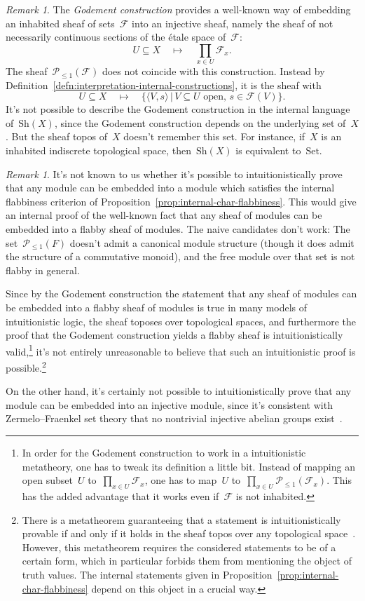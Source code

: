 \documentclass[10pt,reqno,a4paper]{amsbook}
\theoremstyle{definition}
\theoremstyle{plain}
\theoremstyle{remark}
\newtheorem{rem}[defn]{Remark}
\newcommand{\F}{\mathcal{F}}
\renewcommand{\P}{\mathcal{P}}
\newcommand{\Set}{\mathrm{Set}}
\newcommand{\Sh}{\mathrm{Sh}}
\newcommand{\?}{\,{:}\,}
\renewcommand{\_}{\mathpunct{.}\,}
\begin{document}
\begin{rem}\label{rem:godement-construction}
The \emph{Godement construction} provides a well-known way of embedding an
inhabited sheaf of sets~$\F$ into an injective sheaf, namely
the sheaf of not necessarily continuous sections of the étale space of~$\F$:
\[ U \subseteq X \quad\longmapsto\quad
  \prod_{x \in U} \F_x. \]
The sheaf~$\P_{\leq1}(\F)$ does not coincide with this construction.
Instead by Definition~\ref{defn:interpretation-internal-constructions}, it is the sheaf with
\[ U \subseteq X \quad\longmapsto\quad
  \{ \langle V, s \rangle \,|\,
    \text{$V \subseteq U$ open, $s \in \F(V)$} \}. \]
It's not possible to describe the Godement construction in the internal language
of~$\Sh(X)$, since the Godement construction depends on the underlying set of~$X$.
But the sheaf topos of~$X$ doesn't remember this set. For instance, if~$X$
is an inhabited indiscrete topological space, then~$\Sh(X)$ is equivalent
to~$\Set$.
\end{rem}

\begin{rem}It's not known to us whether it's possible to intuitionistically
prove that any module can be embedded into a module which satisfies the internal
flabbiness criterion of Proposition~\ref{prop:internal-char-flabbiness}. This
would give an internal proof of the well-known fact that any sheaf of modules can be embedded into a
flabby sheaf of modules. The naive candidates don't work: The
set~$\P_{\leq1}(F)$ doesn't admit a canonical module structure (though it does admit the structure of a commutative monoid), and the free
module over that set is not flabby in general.

Since by the Godement construction the statement that any sheaf of modules can
be embedded into a flabby sheaf of modules is true in many models of
intuitionistic logic, the sheaf toposes over topological spaces, and
furthermore the proof that the Godement construction yields a flabby sheaf is
intuitionistically valid,\footnote{In order for the Godement construction to
work in a intuitionistic metatheory, one has to tweak its definition a little
bit. Instead of mapping an open subset~$U$ to~$\prod_{x \in U} \F_x$, one has
to map~$U$ to~$\prod_{x \in U} \P_{\leq1}(\F_x)$. This has the added advantage
that it works even if~$\F$ is not inhabited.} it's not entirely unreasonable to believe
that such an intuitionistic proof is possible.\footnote{There is a metatheorem
guaranteeing that a statement is intuitionistically provable if and only if it
holds in the sheaf topos over any topological
space~\cite[Theorem~B]{awodey-butz:completeness}. However, this metatheorem
requires the considered statements to be of a certain form, which in particular
forbids them from mentioning the object of truth values. The internal
statements given in Proposition~\ref{prop:internal-char-flabbiness} depend on
this object in a crucial way.}

On the other hand, it's certainly not possible to intuitionistically prove that
any module can be embedded into an injective module, since it's consistent with
Zermelo--Fraenkel set theory that no nontrivial injective abelian groups
exist~\cite{blass:inj-proj-axc}.
\end{rem}
\end{document}
